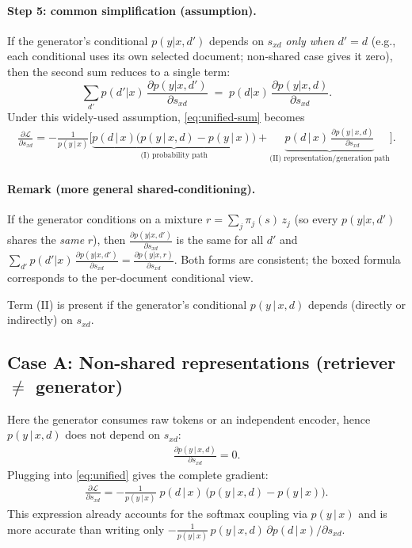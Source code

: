 \documentclass{applemlr}
\newcommand{\px}{p(y\,|\,x)}
\newcommand{\pd}{p(d\,|\,x)}
\newcommand{\qyd}{p(y\,|\,x,d)}
\newcommand{\sd}{s_{xd}}
\numberwithin{equation}{section}
\begin{document}
\paragraph{Step 5: common simplification (assumption).}
If the generator’s conditional $p(y|x,d')$ depends on $s_{xd}$ \emph{only when $d'=d$}
(e.g., each conditional uses its own selected document; non-shared case gives it zero),
then the second sum reduces to a single term:
\[
\sum_{d'} p(d'|x)\,\frac{\partial p(y|x,d')}{\partial s_{xd}}
\;=\; p(d|x)\,\frac{\partial p(y|x,d)}{\partial s_{xd}}.
\]
Under this widely-used assumption, \eqref{eq:unified-sum} becomes
\begin{align}
\boxed{\;
\frac{\partial \mathcal{L}}{\partial \sd}
= -\frac{1}{\px}\Big[
\underbrace{\pd\big(\qyd - \px\big)}_{\text{(I) probability path}}
+
\underbrace{\pd\,\frac{\partial \qyd}{\partial \sd}}_{\text{(II) representation/generation path}}
\Big].
\;}
\label{eq:unified}
\end{align}

\paragraph{Remark (more general shared-conditioning).}
If the generator conditions on a mixture
$r=\sum_j \pi_j(s)\,z_j$ (so every $p(y|x,d')$ shares the \emph{same} $r$),
then $\frac{\partial p(y|x,d')}{\partial s_{xd}}$ is the same for all $d'$ and
$\sum_{d'} p(d'|x)\,\frac{\partial p(y|x,d')}{\partial s_{xd}}=\frac{\partial p(y|x,r)}{\partial s_{xd}}$.
Both forms are consistent; the boxed formula corresponds to the per-document conditional view.

Term (II) is present if the generator's conditional $\qyd$ depends (directly or indirectly) on $\sd$.

\subsection*{Case A: Non-shared representations (retriever $\neq$ generator)}
Here the generator consumes raw tokens or an independent encoder, hence $\qyd$ does not depend on $\sd$:
\begin{align}
\frac{\partial \qyd}{\partial \sd}=0.
\end{align}
Plugging into \eqref{eq:unified} gives the complete gradient:
\begin{align}
\boxed{\;
\frac{\partial \mathcal{L}}{\partial \sd}
= -\frac{1}{\px}\;\pd\,\big(\qyd - \px\big).
\;}
\label{eq:nonshared}
\end{align}
This expression already accounts for the softmax coupling via $\px$ and is more accurate than writing only $-\frac{1}{\px}\,\qyd\,\partial \pd/\partial \sd$.
\end{document}
